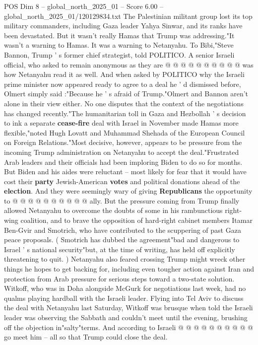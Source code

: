 \begin{textsample}{POS Dim 8 – global\_north\_2025\_01 – Score 6.00 – global\_north\_2025\_01/120129834.txt}
The Palestinian militant group lost its top military commanders, including Gaza leader Yahya Sinwar, and its ranks have been devastated.
But it wasn't really Hamas that Trump was addressing."It wasn't a warning to Hamas.
It was a warning to Netanyahu.
To Bibi,"Steve Bannon, Trump ' s former chief strategist, told POLITICO.
A senior Israeli official, who asked to remain anonymous as they are @ @ @ @ @ @ @ @ @ @ was how Netanyahu read it as well.
And when asked by POLITICO why the Israeli prime minister now appeared ready to agree to a deal he ' d dismissed before, Olmert simply said :"Because he ' s afraid of Trump."Olmert and Bannon aren't alone in their view either.
No one disputes that the context of the negotiations has changed recently."The humanitarian toll in Gaza and Hezbollah ' s decision to ink a separate \textbf{cease-fire} deal with Israel in November made Hamas more flexible,"noted Hugh Lovatt and Muhammad Shehada of the European Council on Foreign Relations."Most decisive, however, appears to be pressure from the incoming Trump administration on Netanyahu to accept the deal."Frustrated Arab leaders and their officials had been imploring Biden to do so for months.
But Biden and his aides were reluctant -- most likely for fear that it would have cost their \textbf{party} Jewish-American \textbf{votes} and political donations ahead of the \textbf{election}.
And they were seemingly wary of giving \textbf{Republicans} the opportunity to @ @ @ @ @ @ @ @ @ @ ally.
But the pressure coming from Trump finally allowed Netanyahu to overcome the doubts of some in his rambunctious right-wing coalition, and to brave the opposition of hard-right cabinet members Itamar Ben-Gvir and Smotrich, who have contributed to the scuppering of past Gaza peace proposals. ( Smotrich has dubbed the agreement"bad and dangerous to Israel ' s national security"but, at the time of writing, has held off explicitly threatening to quit. ) Netanyahu also feared crossing Trump might wreck other things he hopes to get backing for, including even tougher action against Iran and protection from Arab pressure for serious steps toward a two-state solution.
Witkoff, who was in Doha alongside McGurk for negotiations last week, had no qualms playing hardball with the Israeli leader.
Flying into Tel Aviv to discuss the deal with Netanyahu last Saturday, Witkoff was brusque when told the Israeli leader was observing the Sabbath and couldn't meet until the evening, brushing off the objection in"salty"terms.
And according to Israeli @ @ @ @ @ @ @ @ @ @ go meet him -- all so that Trump could close the deal.

\end{textsample}
